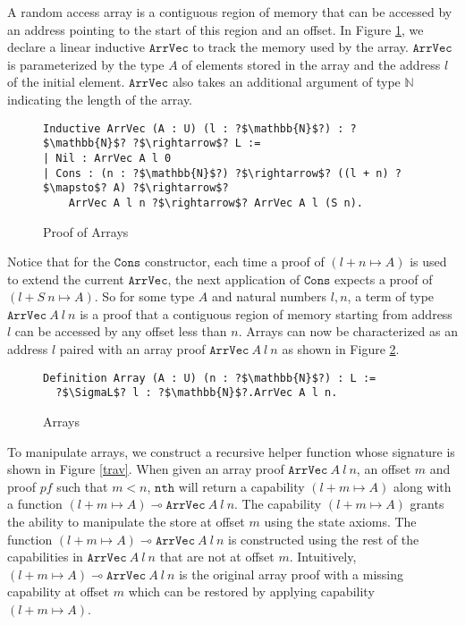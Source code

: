 \documentclass[sigplan,screen,review,anonymous]{acmart}
\newcommand{\SigmaL}{\Sigma_{\scriptscriptstyle L}}
\newcommand{\arrv}{\texttt{ArrVec}}
\begin{document}
A random access array is a contiguous region of memory that can be accessed by an address pointing to the start of this region and an offset. In Figure \ref{arrv}, we declare a linear inductive $\arrv$ to track the memory used by the array. $\arrv$ is parameterized by the type $A$ of elements stored in the array and the address $l$ of the initial element. $\arrv$ also takes an additional argument of type $\mathbb{N}$ indicating the length of the array.

\begin{figure}[h]
  \caption{Proof of Arrays}
  \begin{verbatim}
Inductive ArrVec (A : U) (l : ?$\mathbb{N}$?) : ?$\mathbb{N}$? ?$\rightarrow$? L :=
| Nil : ArrVec A l 0
| Cons : (n : ?$\mathbb{N}$?) ?$\rightarrow$? ((l + n) ?$\mapsto$? A) ?$\rightarrow$? 
    ArrVec A l n ?$\rightarrow$? ArrVec A l (S n).
  \end{verbatim}
  \label{arrv}
  \Description{}
\end{figure}

Notice that for the $\texttt{Cons}$ constructor, each time a proof of $(l + n \mapsto A)$ is used to extend the current $\arrv$, the next application of $\texttt{Cons}$ expects a proof of $(l + S\ n \mapsto A)$. So for some type $A$ and natural numbers $l, n$, a term of type $\arrv\ A\ l\ n$ is a proof that a contiguous region of memory starting from address $l$ can be accessed by any offset less than $n$. Arrays can now be characterized as an address $l$ paired with an array proof $\arrv\ A\ l\ n$ as shown in Figure \ref{array}.

\begin{figure}[h]
  \caption{Arrays}
  \begin{verbatim}
Definition Array (A : U) (n : ?$\mathbb{N}$?) : L := 
  ?$\SigmaL$? l : ?$\mathbb{N}$?.ArrVec A l n.
  \end{verbatim}
  \label{array}
  \Description{}
\end{figure}

To manipulate arrays, we construct a recursive helper function whose signature is shown in Figure \ref{trav}. When given an array proof $\arrv\ A\ l\ n$, an offset $m$ and proof $pf$ such that $m < n$, $\texttt{nth}$ will return a capability $(l + m \mapsto A)$ along with a function $(l + m \mapsto A) \multimap \arrv\ A\ l\ n$. The capability $(l + m \mapsto A)$ grants the ability to manipulate the store at offset $m$ using the state axioms. The function $(l + m \mapsto A) \multimap \arrv\ A\ l\ n$ is constructed using the rest of the capabilities in $\arrv\ A\ l\ n$ that are not at offset $m$. Intuitively, $(l + m \mapsto A) \multimap \arrv\ A\ l\ n$ is the original array proof with a missing capability at offset $m$ which can be restored by applying capability $(l + m \mapsto A)$.
\end{document}
